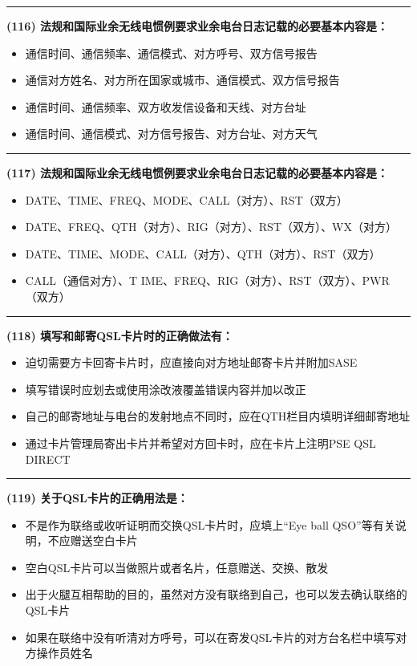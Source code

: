 \documentclass[twocolumn]{ctexart}  %
\begin{document}
\noindent\rule{0.5\textwidth}{1pt}
\heiti \textbf{(116) 法规和国际业余无线电惯例要求业余电台日志记载的必要基本内容是：} \songti {\color{gray} [LK0075] }
\begin{itemize}
	\item  通信时间、通信频率、通信模式、对方呼号、双方信号报告
	\item  通信对方姓名、对方所在国家或城市、通信模式、双方信号报告
	\item  通信时间、通信频率、双方收发信设备和天线、对方台址
	\item  通信时间、通信模式、对方信号报告、对方台址、对方天气
\end{itemize}


\noindent\rule{0.5\textwidth}{1pt}
\heiti \textbf{(117) 法规和国际业余无线电惯例要求业余电台日志记载的必要基本内容是：} \songti {\color{gray} [LK0076] }
\begin{itemize}
	\item  DATE、TIME、FREQ、MODE、CALL（对方）、RST（双方）
	\item  DATE、FREQ、QTH（对方）、RIG（对方）、RST（双方）、WX（对方）
	\item  DATE、TIME、MODE、CALL（对方）、QTH（对方）、RST（双方）
	\item  CALL（通信对方）、T IME、FREQ、RIG（对方）、RST（双方）、PWR（双方）
\end{itemize}


\noindent\rule{0.5\textwidth}{1pt}
\heiti \textbf{(118) 填写和邮寄QSL卡片时的正确做法有：} \songti {\color{gray} [LK1011] }
\begin{itemize}
	\item  迫切需要方卡回寄卡片时，应直接向对方地址邮寄卡片并附加SASE
	\item  填写错误时应划去或使用涂改液覆盖错误内容并加以改正
	\item  自己的邮寄地址与电台的发射地点不同时，应在QTH栏目内填明详细邮寄地址
	\item  通过卡片管理局寄出卡片并希望对方回卡时，应在卡片上注明PSE QSL DIRECT
\end{itemize}


\noindent\rule{0.5\textwidth}{1pt}
\heiti \textbf{(119) 关于QSL卡片的正确用法是：} \songti {\color{gray} [LK1042] }
\begin{itemize}
	\item  不是作为联络或收听证明而交换QSL卡片时，应填上“Eye ball QSO”等有关说明，不应赠送空白卡片
	\item  空白QSL卡片可以当做照片或者名片，任意赠送、交换、散发
	\item  出于火腿互相帮助的目的，虽然对方没有联络到自己，也可以发去确认联络的QSL卡片
	\item  如果在联络中没有听清对方呼号，可以在寄发QSL卡片的对方台名栏中填写对方操作员姓名
\end{itemize}
\end{document}
